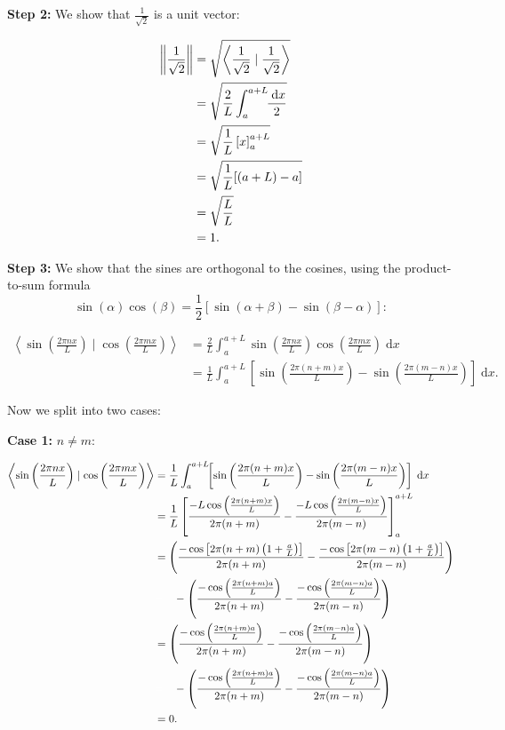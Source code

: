 \documentclass{article}
\newcommand{\diff}{\;\mathrm{d}}
\newcommand{\norm}[1]{\left|\kern-1pt\left|#1\right|\kern-1pt\right|}
\newcommand{\braket}[2]{\left\langle #1 \mid #2 \right\rangle}
\begin{document}
\noindent\textbf{Step 2:} We show that $\frac{1}{\sqrt{2}}$ is a unit vector:\medskip

\begin{align*}
	\norm{\frac{1}{\sqrt{2}}}&=\sqrt{\braket{\frac{1}{\sqrt{2}}}{\frac{1}{\sqrt{2}}}}\\
	&=\sqrt{\frac{2}{L}\int_a^{a+L}\!\!\frac{\diff x}{2}}\\
	&= \sqrt{ \frac{1}{L}\left[x\right]_a^{a+L} }\\
	&=\sqrt{\frac{1}{L}[(a+L)-a]}\\
	&=\sqrt{\frac{L}{L}}\\
	&=1.
\end{align*}

\bigskip





\noindent\textbf{Step 3:} We show that the sines are orthogonal to the cosines, using the product-to-sum formula
\[\sin(\alpha)\cos(\beta)=\frac{1}{2}\left[\sin(\alpha+\beta)-\sin(\beta-\alpha)\right]:\]

\begin{align*}
	\braket{\sin\left(\frac{2\pi nx}{L}\right)}{\cos\left(\frac{2\pi mx}{L}\right)} &= \frac{2}{L}\int_a^{a+L}\!\!\sin\left(\frac{2\pi nx}{L}\right)\cos\left(\frac{2\pi mx}{L}\right)\diff x\\
	&=\frac{1}{L}\int_a^{a+L}\!\!\left[\sin\left(\frac{2\pi (n+m)x}{L}\right)-\sin\left(\frac{2\pi (m-n)x}{L}\right)\right]\diff x.
\end{align*}

Now we split into two cases:

\textbf{Case 1:} $n\neq m$:

\begin{align*}
	\braket{\sin\left(\frac{2\pi nx}{L}\right)}{\cos\left(\frac{2\pi mx}{L}\right)} &= \frac{1}{L}\int_a^{a+L}\!\!\left[\sin\left(\frac{2\pi (n+m)x}{L}\right)-\sin\left(\frac{2\pi (m-n)x}{L}\right)\right]\diff x\\
	&=\frac{1}{L}\left[\frac{-L\cos\left(\frac{2\pi (n+m)x}{L}\right)}{2\pi (n+m)} - \frac{-L\cos\left(\frac{2\pi (m-n)x}{L}\right)}{2\pi (m-n)}\right]_{a}^{a+L}\\
	&=\left(\frac{-\cos\left[2\pi (n+m)\left(1 +\frac{a}{L}\right)\right]}{2\pi (n+m)}-\frac{-\cos\left[2\pi (m-n)\left(1 +\frac{a}{L}\right)\right]}{2\pi (m-n)}\right)\\
	&{\color{white} =\quad} -\left(\frac{-\cos\left(\frac{2\pi (n+m)a}{L}\right)}{2\pi (n+m)}-\frac{-\cos\left(\frac{2\pi (m-n)a}{L}\right)}{2\pi (m-n)}\right)\\
	&=\left(\frac{-\cos\left(\frac{2\pi (n+m)a}{L}\right)}{2\pi (n+m)}-\frac{-\cos\left(\frac{2\pi (m-n)a}{L}\right)}{2\pi (m-n)}\right)\\
	&{\color{white} =\quad}-\left(\frac{-\cos\left(\frac{2\pi (n+m)a}{L}\right)}{2\pi (n+m)}-\frac{-\cos\left(\frac{2\pi (m-n)a}{L}\right)}{2\pi (m-n)}\right)\\
	&=0.
\end{align*}
\end{document}
